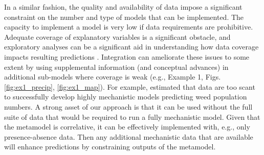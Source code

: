 In a similar fashion, the quality and availability of data impose a significant constraint on the number and type of models that can be implemented.
The capacity to implement a model is very low if data requirements are prohibitive. 
Adequate coverage of explanatory variables is a significant obstacle, and exploratory analyses can be a significant aid in understanding how data coverage impacts resulting predictions \citep{Mckenney2002}.
Integration can ameliorate these issues to some extent by using supplemental information (and conceptual advances) in additional sub-models where coverage is weak (e.g., Example 1, Figs. \ref{fig:ex1_precip}, \ref{fig:ex1_map}).
For example, \citet{Freckleton2009} estimated that data are too scant to successfully develop highly mechanistic models predicting weed population numbers. 
A strong asset of our approach is that it can be used without the full suite of data that would be required to run a fully mechanistic model. 
Given that the metamodel is correlative, it can be effectively implemented with, e.g., only presence-absence data. 
Then any additional mechanistic data that are available will enhance predictions by constraining outputs of the metamodel. 

